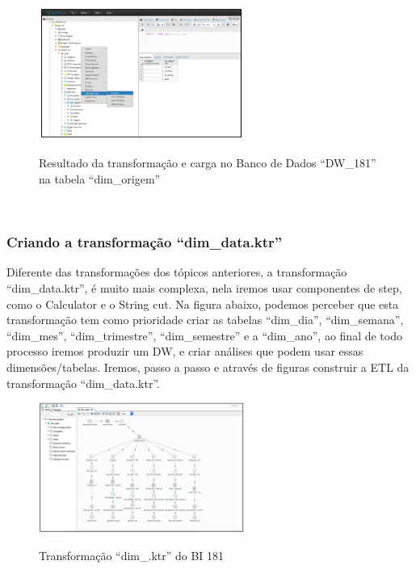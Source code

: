 \begin{figure}[H]
	\vspace*{0,2cm}
    \centering
    \caption{Resultado da transforma\c{c}\~{a}o e carga no Banco de Dados ``DW\_181'' na tabela ``dim\_origem''}
    \includegraphics[width=0.6\textwidth]{./04-figuras/figura-res-dim-origem}
    \label{fig:ilustfigresdimorigem}
\end{figure}
\vspace*{-0,9cm}
{\raggedright {}} \\

\subsubsection{Criando a transforma\c{c}\~{a}o ``dim\_data.ktr''}

Diferente das transforma\c{c}ões dos t\'{o}picos anteriores, a transforma\c{c}\~{a}o ``dim\_data.ktr'', 
\'{e} muito mais complexa, nela iremos usar componentes de step, como o Calculator e o String cut. 
Na figura abaixo, podemos perceber que esta transforma\c{c}\~{a}o tem como prioridade criar 
as tabelas ``dim\_dia'', ``dim\_semana'', ``dim\_mes'', ``dim\_trimestre'', ``dim\_semestre'' e 
a ``dim\_ano'', ao final de todo processo iremos produzir um DW, e criar an\'{a}lises que podem 
usar essas dimensões/tabelas.
Iremos, passo a passo e atrav\'{e}s de figuras construir a ETL da transforma\c{c}\~{a}o ``dim\_data.ktr''.

\begin{figure}[H]
	\vspace*{0,2cm}
    \centering
    \caption{Transforma\c{c}\~{a}o ``dim\_\data.ktr'' do BI 181}
    \includegraphics[width=0.6\textwidth]{./04-figuras/figura-dim-data.png}
    \label{fig:ilustfigresdimdata}
\end{figure}
\vspace*{-0,9cm}
{\raggedright {}} \\

